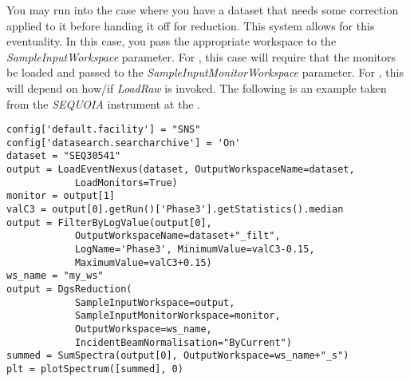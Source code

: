 You may run into the case where you have a dataset that needs some correction applied to it before handing it off for reduction. This system allows for this eventuality. In this case, you pass the appropriate workspace to the \textit{SampleInputWorkspace} parameter. For \sns{}, this case will require that the monitors be loaded and passed to the \textit{SampleInputMonitorWorkspace} parameter. For \isis{}, this will depend on how/if \textit{LoadRaw} is invoked. The following is an example taken from the \textit{SEQUOIA} instrument at the \sns{}. 
\begin{verbatim}
config['default.facility'] = "SNS"
config['datasearch.searcharchive'] = 'On'
dataset = "SEQ30541"
output = LoadEventNexus(dataset, OutputWorkspaceName=dataset, 
            LoadMonitors=True)
monitor = output[1]
valC3 = output[0].getRun()['Phase3'].getStatistics().median
output = FilterByLogValue(output[0], 
            OutputWorkspaceName=dataset+"_filt", 
            LogName='Phase3', MinimumValue=valC3-0.15, 
            MaximumValue=valC3+0.15)
ws_name = "my_ws"
output = DgsReduction(
            SampleInputWorkspace=output,
            SampleInputMonitorWorkspace=monitor,
            OutputWorkspace=ws_name,
            IncidentBeamNormalisation="ByCurrent")
summed = SumSpectra(output[0], OutputWorkspace=ws_name+"_s")
plt = plotSpectrum([summed], 0)            
\end{verbatim}